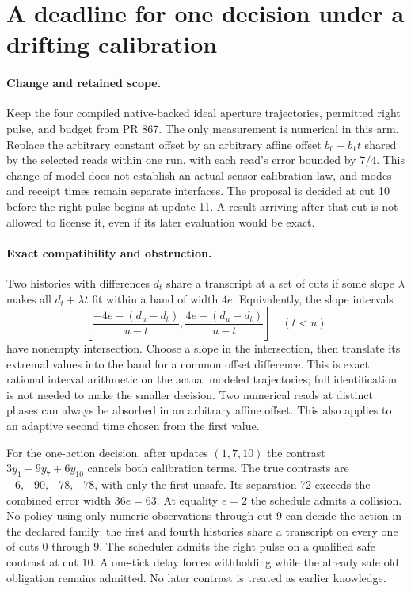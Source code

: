 \documentclass{article}
\begin{document}
\section*{A deadline for one decision under a drifting calibration}
\paragraph{Change and retained scope.}
Keep the four compiled native-backed ideal aperture trajectories,
permitted right pulse, and budget from PR 867. The only measurement
is numerical in this arm. Replace the arbitrary constant offset by
an arbitrary affine offset $b_0+b_1 t$ shared by the selected reads
within one run, with each read's error bounded by $7/4$. This change
of model does not establish an actual sensor calibration law, and
modes and receipt times remain separate interfaces.
The proposal is decided at cut 10 before the right pulse begins
at update 11. A result arriving after that cut is not allowed to
license it, even if its later evaluation would be exact.

\paragraph{Exact compatibility and obstruction.}
Two histories with differences $d_t$ share a transcript at a set of
cuts if some slope $\lambda$ makes all $d_t+\lambda t$ fit within a
band of width $4e$. Equivalently, the slope intervals
\[
 \left[\frac{-4e-(d_u-d_t)}{u-t},
       \frac{4e-(d_u-d_t)}{u-t}\right]\quad(t<u)
\]
have nonempty intersection. Choose a slope in the intersection,
then translate its extremal values into the band for a common
offset difference. This is exact rational interval arithmetic
on the actual modeled trajectories; full identification is not
needed to make the smaller decision. Two numerical reads at
distinct phases can always be absorbed in an arbitrary affine
offset. This also applies to an adaptive second time chosen
from the first value.

For the one-action decision, after updates $(1,7,10)$ the
contrast $3y_1-9y_7+6y_{10}$ cancels both calibration terms.
The true contrasts are $-6,-90,-78,-78$, with only the
first unsafe. Its separation 72 exceeds the combined error
width $36e=63$. At equality $e=2$ the schedule admits a
collision. No policy using only numeric observations through
cut 9 can decide the action in the declared family: the first
and fourth histories share a transcript on every one of
cuts 0 through 9. The scheduler admits the right pulse on a
qualified safe contrast at cut 10. A one-tick delay forces
withholding while the already safe old obligation remains
admitted. No later contrast is treated as earlier knowledge.
\end{document}
